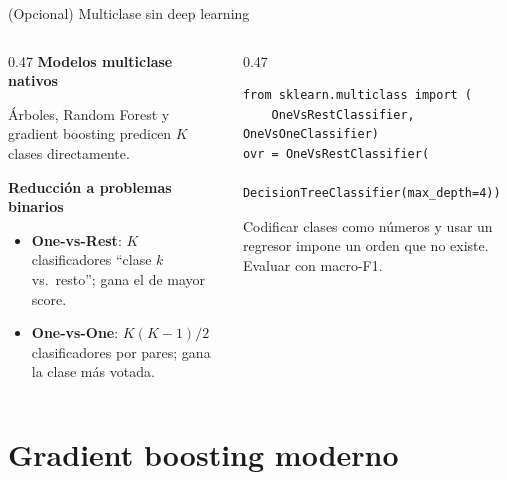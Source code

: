 \documentclass[aspectratio=169,12pt]{beamer}
\newcommand{\colhead}[1]{\textbf{#1}\par\vspace{2pt}}
\begin{document}
\begin{frame}[fragile]{(Opcional) Multiclase sin deep learning}
  \begin{columns}[T]
    \begin{column}{0.47\textwidth}
      \colhead{Modelos multiclase nativos}
      \small Árboles, Random Forest y gradient boosting predicen $K$ clases directamente.
      \vspace{6pt}

      \colhead{Reducción a problemas binarios}
      \begin{itemize}
        \item \textbf{One-vs-Rest}: $K$ clasificadores ``clase $k$ vs.\ resto''; gana el de mayor score.
        \item \textbf{One-vs-One}: $K(K-1)/2$ clasificadores por pares; gana la clase más votada.
      \end{itemize}
    \end{column}
    \begin{column}{0.47\textwidth}
\begin{lstlisting}[basicstyle=\ttfamily\scriptsize,columns=fullflexible,keepspaces=true]
from sklearn.multiclass import (
    OneVsRestClassifier, OneVsOneClassifier)
ovr = OneVsRestClassifier(
    DecisionTreeClassifier(max_depth=4))
\end{lstlisting}
      \begin{rulebox}[Cuidado]
        \small Codificar clases como números y usar un regresor impone un orden que no existe. Evaluar con macro-F1.
      \end{rulebox}
    \end{column}
  \end{columns}
\end{frame}

\section{Gradient boosting moderno}
\end{document}
